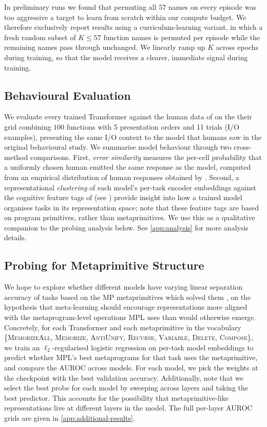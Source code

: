 \documentclass[12pt]{article}
\begin{document}
In preliminary runs we found that permuting all $57$ names on every episode was too aggressive a target to learn from scratch within our compute budget. We therefore exclusively report results using a curriculum-learning variant, in which a fresh random subset of $K \leq 57$ function names is permuted per episode while the remaining names pass through unchanged. We linearly ramp up $K$ across epochs during training, so that the model receives a clearer, immediate signal during training.

\subsection{Behavioural Evaluation}
\label{sec:behavioural-evaluation}

We evaluate every trained Transformer against the human data of \citet{rule2024symbolic} on the their grid combining $100$ functions with 5 presentation orders and 11 trials (I/O examples), presenting the same I/O context to the model that humans saw in the original behavioural study. We summarise model behaviour through two cross-method comparisons. First, \emph{error similarity} measures the per-cell probability that a uniformly chosen human emitted the same response as the model, computed from an empirical distribution of human responses obtained by \citet{rule2024symbolic}. Second, a representational \emph{clustering} of each model's per-task encoder embeddings against the cognitive feature tags of \citet{rule2024symbolic} (see ) provide insight into how a trained model organises tasks in its representation space; note that these feature tags are based on program primitives, rather than metaprimitives. We use this as a qualitative companion to the probing analysis below. See \cref{app:analysis} for more analysis details.

\subsection{Probing for Metaprimitive Structure}
\label{sec:probing}

We hope to explore whether different models have varying linear separation accuracy of tasks based on the MP metaprimitives which solved them \citep{rule2024symbolic}, on the hypothesis that meta-learning should encourage representations more aligned with the metaprogram-level operations MPL uses than would otherwise emerge. Concretely, for each Transformer and each metaprimitive in the vocabulary \{\textsc{MemorizeAll}, \textsc{Memorize}, \textsc{AntiUnify}, \textsc{Recurse}, \textsc{Variable}, \textsc{Delete}, \textsc{Compose}\}, we train an $\ell_2$-regularised logistic regression on per-task model embeddings to predict whether MPL's best metaprograms for that task uses the metaprimitive, and compare the AUROC across models. For each model, we pick the weights at the checkpoint with the best validation accuracy. Additionally, note that we select the best probe for each model by sweeping across layers and taking the best predictor. This accounts for the possibility that metaprimitive-like representations live at different layers in the model. The full per-layer AUROC grids are given in \cref{app:additional-results}.
\end{document}
